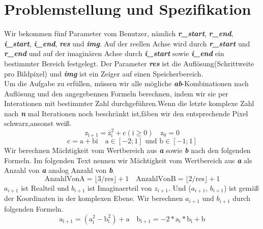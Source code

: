 \documentclass[course=erap]{aspdoc}
\begin{document}
\section{Problemstellung und Spezifikation}
Wir bekommen fünf Parameter vom Benutzer, nämlich \emph{\textbf{r\_start}}, \textbf{\emph{r\_end}}, \textbf{\emph{i\_start}}, \textbf{\emph{i\_end}}, \textbf{\emph{res}} und \textbf{\emph{img}}. Auf der reellen Achse wird durch \emph{\textbf{r\_start}} und \emph{\textbf{r\_end}} und auf der imaginären Achse durch \textbf{\emph{i\_start}} sowie\textbf{\emph{ i\_end}} ein bestimmter Bereich festgelegt. Der Parameter \emph{\textbf{res}} ist die Auflösung(Schrittweite pro Bildpixel) und \textbf{\emph{img}} ist ein Zeiger auf einen Speicherbereich.
\\Um die Aufgabe zu erfüllen, müssen wir alle mögliche \textbf{\emph{ab}}-Kombinationen nach Auflösung und den angegebennen Formeln berechnen, indem wir sie per Interationen mit bestimmter Zahl durchgeführen.Wenn die letzte komplexe Zahl nach \textbf{\emph{n}} mal Iterationen noch beschränkt ist,fäben wir den entsprechende Pixel schwarz,ansonst weiß.
 \begin{equation}
\mathrm{z_{i+1}}=\mathrm{\bar{z}_{i}^{2}}+\mathrm{c}(\mathrm{i} \geq 0) \quad \mathrm{z_{0}}=0
\end{equation}
\begin{equation}\mathrm{c}=\mathrm{a}+\mathrm{bi} \quad \mathrm{a} \in[-2 ; 1] \text { und } \mathrm{b} \in[-1 ; 1]\end{equation}
 Wir berechnen Mächtigkeit vom Wertbereich aus \textbf{\emph{a}} sowie \textbf{\emph{b}} nach den folgenden Formeln. Im folgenden Text nennen wir Mächtigkeit vom Wertbereich aus \textbf{\emph{a}} als Anzahl von \textbf{\emph{a}} analog Anzahl von \textbf{\emph{b}}.
 \begin{equation}
\mathrm{AnzahlVonA}  =\lfloor 3 /\mathrm{res}\rfloor+1   \quad  \mathrm{AnzahlVonB}  =\lfloor 2 / \mathrm{res}\rfloor+ 1
\end{equation}
\textbf{\emph{$a_{i+1}$}} ist Realteil und \textbf{\emph{$b_{i+1}$}} ist Imaginaerteil von \emph{\textbf{$z_{i+1}$}}. Und (\textbf{\emph{$a_{i+1}$}}, \textbf{\emph{$b_{i+1}$}}) ist gemäß der Koordinaten in der komplexen Ebene. Wir berechnen \textbf{\emph{$a_{i+1}$}} und \textbf{\emph{$b_{i+1}$}} durch folgenden Formeln.
\begin{equation}
\mathrm{a_{i+1}}= (\mathrm{a_{i}^2}-\mathrm{b_{i}^2})+\mathrm{a}\quad \mathrm{b_{i+1}} = -2*\mathrm{a_{i}}*\mathrm{b_{i}}+\mathrm{b}
\end{equation}
\end{document}

